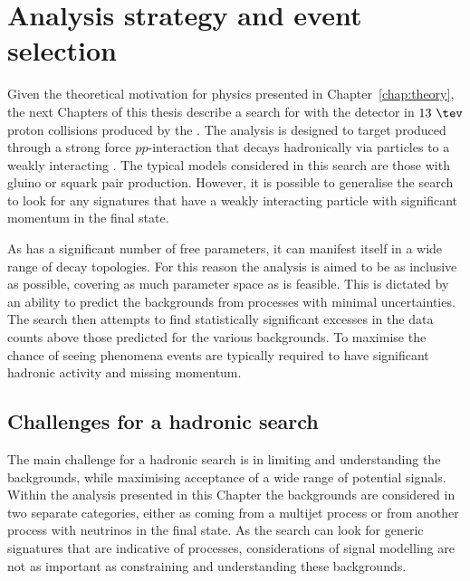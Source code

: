 \chapter{Analysis strategy and event selection} %
\label{chap:selection}

Given the theoretical motivation for \BSM physics presented in
Chapter~\ref{chap:theory}, the next Chapters of this thesis describe a
search for \SUSY with the \CMS detector in $13~\tev$ proton collisions
produced by the \LHC. The analysis is designed to target \SUSY
produced through a strong force $pp$-interaction that decays hadronically via
\SM particles to a weakly interacting \LSP. The typical \SUSY models
considered in this search are those with gluino or squark pair
production. However, it is possible to generalise the search to look
for any \BSM signatures that have a weakly interacting particle with
significant momentum in the final state.

As \SUSY has a significant number of free parameters, it can manifest
itself in a wide range of decay topologies. For this reason the
analysis is aimed to be as inclusive as possible, covering as much
parameter space as is feasible.  This is dictated by an ability to
predict the backgrounds from \SM processes with minimal uncertainties.
The search then attempts to find statistically significant excesses in
the data counts above those predicted for the various backgrounds. To
maximise the chance of seeing \BSM phenomena events are typically
required to have significant hadronic activity and missing momentum.  


\section{Challenges for a hadronic \BSM search}
\label{sec:challenge}

The main challenge for a hadronic \BSM search is in limiting and
understanding the backgrounds, while maximising acceptance of a wide
range of potential \BSM signals. Within the analysis presented in this
Chapter the backgrounds are considered in two separate categories,
either as coming from a \QCD multijet process or from another \SM process
with neutrinos in the final state. As the search can look for generic
signatures that are indicative of \BSM processes, considerations of
signal modelling are not as important as constraining
and understanding these backgrounds.

